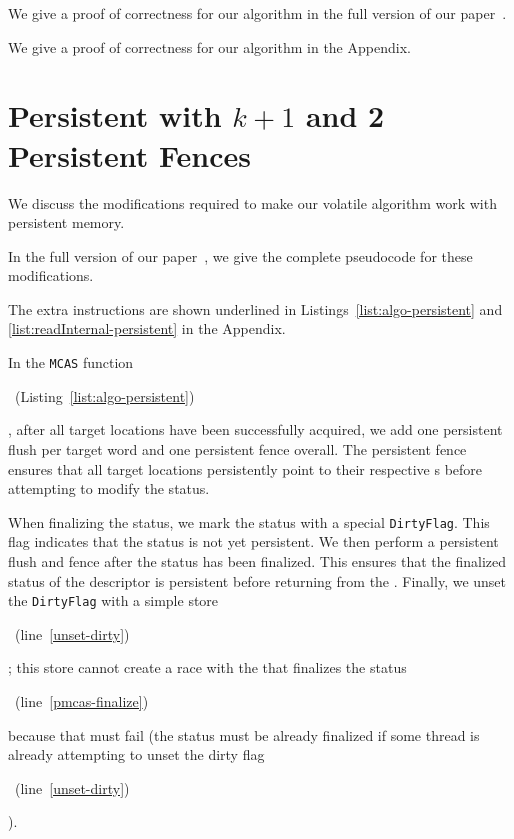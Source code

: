 \begin{camera}
We give a proof of correctness for our algorithm in the full version of our paper~\cite{longversion}.
\end{camera}\begin{arxiv}
We give a proof of correctness for our algorithm in the Appendix.
\end{arxiv}

\section{Persistent \mcas{} with \texorpdfstring{$k+1$}{k+1} \cas{} and 2 Persistent Fences}\label{sec:persistent-mcas}

We discuss the modifications required to make our volatile \mcas{} algorithm work with persistent memory. 
\begin{camera}
In the full version of our paper~\cite{longversion}, we give the complete pseudocode for these modifications.
\end{camera}\begin{arxiv}
The extra instructions are shown underlined in Listings~\ref{list:algo-persistent} and \ref{list:readInternal-persistent} in the Appendix.
\end{arxiv}

In the \texttt{MCAS} function\begin{camera}\end{camera}\begin{arxiv}~(Listing~\ref{list:algo-persistent})\end{arxiv}, after all target locations have been successfully acquired, we add one persistent flush per target word and one persistent fence overall. The persistent fence ensures that all target locations persistently point to their respective {\worddescriptor}s before attempting to modify the status. 

When finalizing the status, we mark the status with a special \texttt{DirtyFlag}. This flag indicates that the status is not yet persistent. We then perform a persistent flush and fence after the status has been finalized. This ensures that the finalized status of the descriptor is persistent before returning from the \mcas{}. Finally, we unset the \texttt{DirtyFlag} with a simple store\begin{camera}\end{camera}\begin{arxiv}~(line~\ref{unset-dirty})\end{arxiv}; this store cannot create a race with the \cas{} that finalizes the status\begin{camera}\end{camera}\begin{arxiv}~(line~\ref{pmcas-finalize})\end{arxiv} because that \cas{} must fail (the status must be already finalized if some thread is already attempting to unset the dirty flag\begin{camera}\end{camera}\begin{arxiv}~(line~\ref{unset-dirty})\end{arxiv}).

